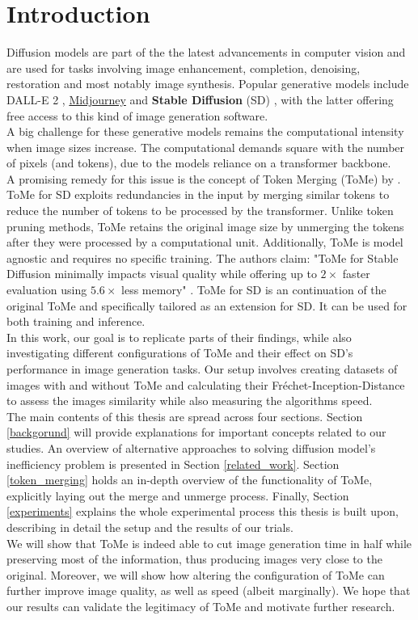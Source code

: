 \section{Introduction}
Diffusion models are part of the the latest advancements in computer vision and are used for tasks involving image enhancement, completion, denoising, restoration and most notably image synthesis. Popular generative models include DALL-E 2 \cite{ramesh2022hierarchical}, \href{https://www.midjourney.com}{Midjourney} and \textbf{Stable Diffusion} (SD) \cite{rombach2021highresolution}, with the latter offering free access to this kind of image generation software.\\
A big challenge for these generative models remains the computational intensity when image sizes increase. The computational demands square with the number of pixels (and tokens), due to the models reliance on a transformer backbone.\\
A promising remedy for this issue is the concept of Token Merging (ToMe) by \cite{bolya2023tomesd}. ToMe for SD exploits redundancies in the input by merging similar tokens to reduce the number of tokens to be processed by the transformer. Unlike token pruning methods, ToMe retains the original image size by unmerging the tokens after they were processed by a computational unit. Additionally, ToMe is model agnostic and requires no specific training. The authors claim: "ToMe for Stable Diffusion minimally impacts visual quality while offering up to $2 \times$ faster evaluation using $5.6 \times$ less memory" \cite{bolya2023tomesd}. ToMe for SD is an continuation of the original ToMe \cite{bolya2023tome} and specifically tailored as an extension for SD. It can be used for both training and inference.\\
In this work, our goal is to replicate parts of their findings, while also investigating different configurations of ToMe and their effect on SD's performance in image generation tasks. Our setup involves creating datasets of images with and without ToMe and calculating their Fréchet-Inception-Distance to assess the images similarity while also measuring the algorithms speed.\\
The main contents of this thesis are spread across four sections. Section \ref{backgorund} will provide explanations for important concepts related to our studies. An overview of alternative approaches to solving diffusion model's inefficiency problem is presented in Section \ref{related_work}. Section \ref{token_merging} holds an in-depth overview of the functionality of ToMe, explicitly laying out the merge and unmerge process. Finally, Section \ref{experiments} explains the whole experimental process this thesis is built upon, describing in detail the setup and the results of our trials.\\
We will show that ToMe is indeed able to cut image generation time in half while preserving most of the information, thus producing images very close to the original. Moreover, we will show how altering the configuration of ToMe can further improve image quality, as well as speed (albeit marginally). We hope that our results can validate the legitimacy of ToMe and motivate further research.\\


